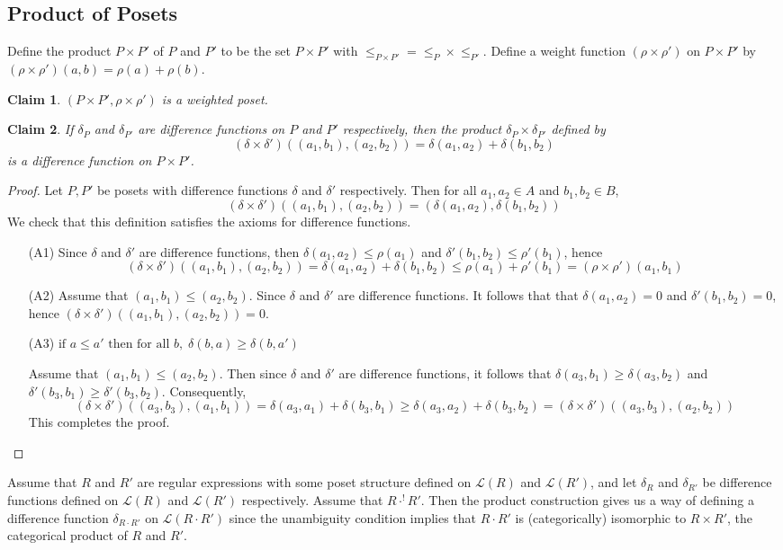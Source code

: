 \documentclass[acmsmall,review,anonymous]{acmart}\settopmatter{printfolios=true,printccs=false,printacmref=false}
\newtheorem{claim}{Claim}
\begin{document}
\subsection{Product of Posets}
Define the product $P \times P'$ of $P$ and $P'$ to be the set $P \times P'$
with $\leq_{P \times P'} = \leq_P \times \leq_{P'}$. Define a weight function
$(\rho \times \rho')$ on $P \times P'$ by $(\rho \times \rho')(a, b) = \rho(a)
+ \rho(b)$.
\begin{claim}
$(P \times P', \rho \times \rho')$ is a weighted poset.
\end{claim}
\begin{claim}
If $\delta_P$ and $\delta_{P'}$ are difference functions on $P$ and $P'$
respectively, then the product $\delta_P \times \delta_{P'}$ defined by
$$(\delta \times \delta')((a_1, b_1), (a_2, b_2)) = \delta(a_1, a_2) +
\delta(b_1, b_2)$$
is a difference function on $P \times P'$.
\end{claim}
\begin{proof}
Let $P, P'$ be posets with difference functions $\delta$ and $\delta'$
respectively. Then for all $a_1, a_2 \in A$ and $b_1, b_2 \in B$,
$$
(\delta \times \delta')((a_1, b_1), (a_2, b_2)) = (\delta(a_1, a_2),
\delta(b_1, b_2))
$$
We check that this definition satisfies the axioms for difference functions.
\begin{enumerate}
  \item[(A1)]
  Since $\delta$ and $\delta'$ are difference functions, then $\delta(a_1, a_2)
  \leq \rho(a_1)$ and $\delta'(b_1, b_2) \leq \rho'(b_1)$, hence $$
  (\delta \times \delta')((a_1, b_1), (a_2, b_2)) = \delta(a_1, a_2) +
  \delta(b_1, b_2) \leq \rho(a_1) + \rho'(b_1) = (\rho \times
  \rho')(a_1, b_1)$$
  \item[(A2)]
  Assume that $(a_1, b_1) \leq (a_2, b_2)$. Since $\delta$ and
  $\delta'$ are difference functions. It follows that that $\delta(a_1, a_2) =
  0$ and $\delta'(b_1, b_2) = 0$, hence $(\delta \times \delta')((a_1, b_1),
  (a_2, b_2)) = 0$.
  \item[(A3)]
  $\text{if } a \leq a' \text{ then for all }b , \; \delta(b, a) \geq \delta(b,
  a')$
  
  Assume that $(a_1, b_1) \leq (a_2, b_2)$. Then since $\delta$ and $\delta'$ are
  difference functions, it follows that $\delta(a_3, b_1) \geq \delta(a_3, b_2)$
  and $\delta'(b_3, b_1) \geq \delta'(b_3, b_2)$. Consequently,
  $$(\delta \times \delta')((a_3, b_3), (a_1, b_1)) = \delta(a_3, a_1) +
  \delta(b_3, b_1) \geq \delta(a_3, a_2) + \delta(b_3, b_2) = (\delta \times
  \delta')((a_3, b_3), (a_2, b_2))$$
  This completes the proof.
\end{enumerate}
\end{proof}
Assume that $R$ and $R'$ are regular expressions with some poset structure
defined on $\mathcal{L}(R)$ and $\mathcal{L}(R')$, and let $\delta_R$ and
$\delta_{R'}$ be difference functions defined on $\mathcal{L}(R)$ and
$\mathcal{L}(R')$ respectively. Assume that $R \cdot^! R'$. Then the product
construction gives us a way of defining a difference function $\delta_{R \cdot
R'}$ on $\mathcal{L}(R \cdot R')$ since the unambiguity condition implies that
$R \cdot R'$ is (categorically) isomorphic to $R \times R'$, the categorical
product of $R$ and $R'$.
\end{document}
